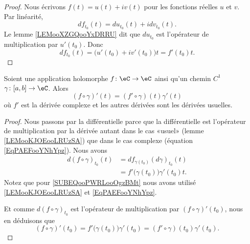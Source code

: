 \begin{proof}
	Nous écrivons \( f(t)=u(t)+iv(t)\) pour les fonctions réelles \( u\) et \( v\). Par linéarité,
	\begin{equation}
		df_{t_0}(t)=du_{t_0}(t)+idv_{t_0}(t).
	\end{equation}
	Le lemme \ref{LEMooXZGQooYxDRRU} dit que \( du_{t_0}\) est l'opérateur de multiplication par \( u'(t_0)\). Donc
	\begin{equation}
		df_{t_0}(t)=\big( u'(t_0)+iv'(t_0) \big)t=f'(t_0)t.
	\end{equation}
\end{proof}

\begin{proposition}	\label{PROPooBLGMooYeZZYJ}
	Soient une application holomorphe \(f \colon \eC\to \eC  \) ainsi qu'un chemin \( C^1\) \(\gamma \colon \mathopen[ a,b\mathclose]\to \eC  \). Alors
	\begin{equation}
		(f\circ\gamma)'(t)=(f'\circ\gamma)(t)\gamma'(t)
	\end{equation}
	où \( f'\) est la dérivée complexe et les autres dérivées sont les dérivées usuelles.
\end{proposition}

\begin{proof}
	Nous passons par la différentielle parce que la différentielle est l'opérateur de multiplication par la dérivée autant dans le cas «usuel» (lemme \ref{LEMooKJOEooLRUzSA}) que dans le cas complexe (équation \ref{EqPAEFooYNhYpz}). Nous avons
	\begin{subequations}
		\begin{align}
			d(f\circ\gamma)_{t_0}(t) & =df_{\gamma(t_0)}(d\gamma)_{t_0}(t)                                  \\
			                         & =f'\big( \gamma(t_0) \big)\gamma'(t_0)t.	\label{SUBEQooPWRLooOgzBMt}
		\end{align}
	\end{subequations}
	Notez que pour \eqref{SUBEQooPWRLooOgzBMt} nous avons utilisé \ref{LEMooKJOEooLRUzSA} et \ref{EqPAEFooYNhYpz}.

	Et comme \( d(f\circ\gamma)_{t_0}\) est l'opérateur de multiplication par \( (f\circ\gamma)'(t_0)\), nous en déduisons que
	\begin{equation}
		(f\circ\gamma)'(t_0)=f'\big( \gamma(t_0) \big)\gamma'(t_0)=(f'\circ\gamma)(t_0)\gamma'(t_0).
	\end{equation}
\end{proof}



